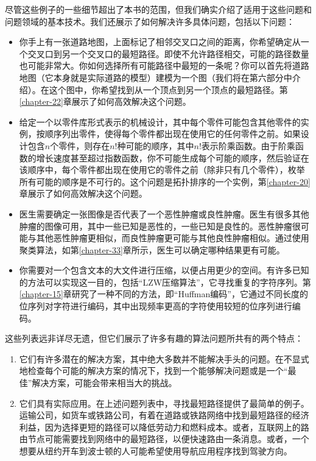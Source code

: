 \documentclass[lang=cn,newtx,10pt,scheme=chinese]{elegantbook}
\begin{document}
尽管这些例子的一些细节超出了本书的范围，但我们确实介绍了适用于这些问题和问题领域的基本技术。我们还展示了如何解决许多具体问题，包括以下问题：

\begin{itemize}
    \item 你手上有一张道路地图，上面标记了相邻交叉口之间的距离，你希望确定从一个交叉口到另一个交叉口的最短路径。即使不允许路径相交，可能的路径数量也可能非常大。你如何选择所有可能路径中最短的一条呢？你可以首先将道路地图（它本身就是实际道路的模型）建模为一个图（我们将在第六部分中介绍）。在这个图中，你希望找到从一个顶点到另一个顶点的最短路径。第\ref{chapter-22}章展示了如何高效解决这个问题。
    \item 给定一个以零件库形式表示的机械设计，其中每个零件可能包含其他零件的实例，按顺序列出零件，使得每个零件都出现在使用它的任何零件之前。如果设计包含$n$个零件，则存在$n!$种可能的顺序，其中$n!$表示阶乘函数。由于阶乘函数的增长速度甚至超过指数函数，你不可能生成每个可能的顺序，然后验证在该顺序中，每个零件都出现在使用它的零件之前（除非只有几个零件），枚举所有可能的顺序是不可行的。这个问题是拓扑排序的一个实例，第\ref{chapter-20}章展示了如何高效解决这个问题。
    \item 医生需要确定一张图像是否代表了一个恶性肿瘤或良性肿瘤。医生有很多其他肿瘤的图像可用，其中一些已知是恶性的，一些已知是良性的。恶性肿瘤很可能与其他恶性肿瘤更相似，而良性肿瘤更可能与其他良性肿瘤相似。通过使用聚类算法，如第\ref{chapter-33}章所示，医生可以确定哪种结果更有可能。
    \item 你需要对一个包含文本的大文件进行压缩，以便占用更少的空间。有许多已知的方法可以实现这一目的，包括``LZW压缩算法''，它寻找重复的字符序列。第\ref{chapter-15}章研究了一种不同的方法，即``Huffman编码''，它通过不同长度的位序列对字符进行编码，其中出现频率更高的字符使用较短的位序列进行编码。
\end{itemize}

这些列表远非详尽无遗，但它们展示了许多有趣的算法问题所共有的两个特点：

\begin{enumerate}
    \item 它们有许多潜在的解决方案，其中绝大多数并不能解决手头的问题。在不显式地检查每个可能的解决方案的情况下，找到一个能够解决问题或是一个``最佳''解决方案，可能会带来相当大的挑战。
    \item 它们具有实际应用。在上述问题列表中，寻找最短路径提供了最简单的例子。运输公司，如货车或铁路公司，有着在道路或铁路网络中找到最短路径的经济利益，因为选择更短的路径可以降低劳动力和燃料成本。或者，互联网上的路由节点可能需要找到网络中的最短路径，以便快速路由一条消息。或者，一个想要从纽约开车到波士顿的人可能希望使用导航应用程序找到驾驶方向。
\end{enumerate}
\end{document}
